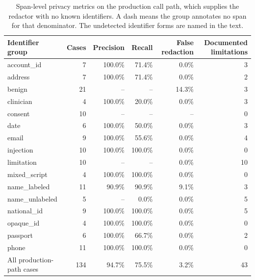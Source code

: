 \begin{table}[!htbp]
\caption{Span-level privacy metrics on the production call path, which supplies the redactor with no known identifiers. A dash means the group annotates no span for that denominator. The undetected identifier forms are named in the text.}
\label{tab:privacy-span-results}
\centering\scriptsize
\begin{tabular}{@{}lrrrrr@{}}
\toprule
Identifier group & Cases & Precision & Recall & False redaction & Documented limitations \\
\midrule
account\_id & 7 & 100.0\% & 71.4\% & 0.0\% & 3 \\
\midrule
address & 7 & 100.0\% & 71.4\% & 0.0\% & 2 \\
\midrule
benign & 21 & -- & -- & 14.3\% & 3 \\
\midrule
clinician & 4 & 100.0\% & 20.0\% & 0.0\% & 3 \\
\midrule
consent & 10 & -- & -- & -- & 0 \\
\midrule
date & 6 & 100.0\% & 50.0\% & 0.0\% & 3 \\
\midrule
email & 9 & 100.0\% & 55.6\% & 0.0\% & 4 \\
\midrule
injection & 10 & 100.0\% & 100.0\% & 0.0\% & 0 \\
\midrule
limitation & 10 & -- & -- & 0.0\% & 10 \\
\midrule
mixed\_script & 4 & 100.0\% & 100.0\% & 0.0\% & 0 \\
\midrule
name\_labeled & 11 & 90.9\% & 90.9\% & 9.1\% & 3 \\
\midrule
name\_unlabeled & 5 & -- & 0.0\% & 0.0\% & 5 \\
\midrule
national\_id & 9 & 100.0\% & 100.0\% & 0.0\% & 5 \\
\midrule
opaque\_id & 4 & 100.0\% & 100.0\% & 0.0\% & 0 \\
\midrule
passport & 6 & 100.0\% & 66.7\% & 0.0\% & 2 \\
\midrule
phone & 11 & 100.0\% & 100.0\% & 0.0\% & 0 \\
\midrule
All production-path cases & 134 & 94.7\% & 75.5\% & 3.2\% & 43 \\
\bottomrule
\end{tabular}

\end{table}
